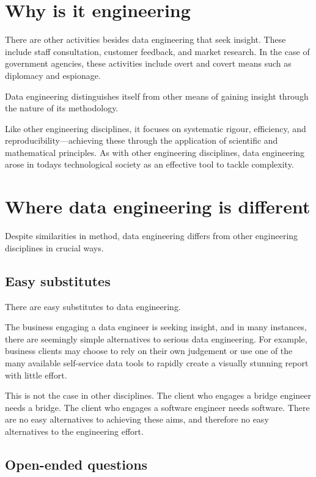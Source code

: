 \documentclass[10pt,openany,10pt]{book}
\begin{document}
\section{Why is it engineering}\label{why-is-it-engineering}

There are other activities besides data engineering that seek insight.
These include staff consultation, customer feedback, and market
research. In the case of government agencies, these activities include
overt and covert means such as diplomacy and espionage.

Data engineering distinguishes itself from other means of gaining
insight through the nature of its methodology.

Like other engineering disciplines, it focuses on systematic rigour,
efficiency, and reproducibility---achieving these through the
application of scientific and mathematical principles. As with other
engineering disciplines, data engineering arose in
today\textquotesingle s technological society as an effective tool to
tackle complexity.

\section{Where data engineering is
different}\label{where-data-engineering-is-different}

Despite similarities in method, data engineering differs from other
engineering disciplines in crucial ways.

\subsection{Easy substitutes}\label{easy-substitutes}

There are easy substitutes to data engineering.

The business engaging a data engineer is seeking insight, and in many
instances, there are seemingly simple alternatives to serious data
engineering. For example, business clients may choose to rely on their
own judgement or use one of the many available self-service data tools
to rapidly create a visually stunning report with little effort.

This is not the case in other disciplines. The client who engages a
bridge engineer needs a bridge. The client who engages a software
engineer needs software. There are no easy alternatives to achieving
these aims, and therefore no easy alternatives to the engineering
effort.

\subsection{Open-ended questions}\label{open-ended-questions}
\end{document}
